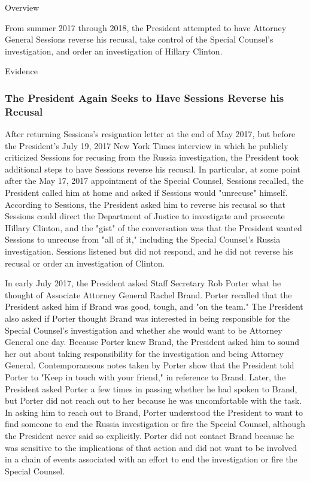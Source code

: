 Overview

From summer 2017 through 2018, the President attempted to have Attorney General Sessions reverse his recusal, take control of the Special Counsel's investigation, and order an investigation of Hillary Clinton.

Evidence

\subsubsection{The President Again Seeks to Have Sessions Reverse his Recusal}

After returning Sessions's resignation letter at the end of May 2017, but before the President's July 19, 2017 New York Times interview in which he publicly criticized Sessions for recusing from the Russia investigation, the President took additional steps to have Sessions reverse his recusal.
In particular, at some point after the May 17, 2017 appointment of the Special Counsel, Sessions recalled, the President called him at home and asked if Sessions would "unrecuse" himself.%
According to Sessions, the President asked him to reverse his recusal so that Sessions could direct the Department of Justice to investigate and prosecute Hillary Clinton, and the "gist" of the conversation was that the President wanted Sessions to unrecuse from "all of it," including the Special Counsel's Russia investigation.%
Sessions listened but did not respond, and he did not reverse his recusal or order an investigation of Clinton.%

In early July 2017, the President asked Staff Secretary Rob Porter what he thought of Associate Attorney General Rachel Brand.%
Porter recalled that the President asked him if Brand was good, tough, and "on the team."%
The President also asked if Porter thought Brand was interested in being responsible for the Special Counsel's investigation and whether she would want to be Attorney General one day.%
Because Porter knew Brand, the President asked him to sound her out about taking responsibility for the investigation and being Attorney General.%
Contemporaneous notes taken by Porter show that the President told Porter to "Keep in touch with your friend," in reference to Brand.%
Later, the President asked Porter a few times in passing whether he had spoken to Brand, but Porter did not reach out to her because he was uncomfortable with the task.%
In asking him to reach out to Brand, Porter understood the President to want to find someone to end the Russia investigation or fire the Special Counsel, although the President never said so explicitly.%
Porter did not contact Brand because he was sensitive to the implications of that action and did not want to be involved in a chain of events associated with an effort to end the investigation or fire the Special Counsel.%

